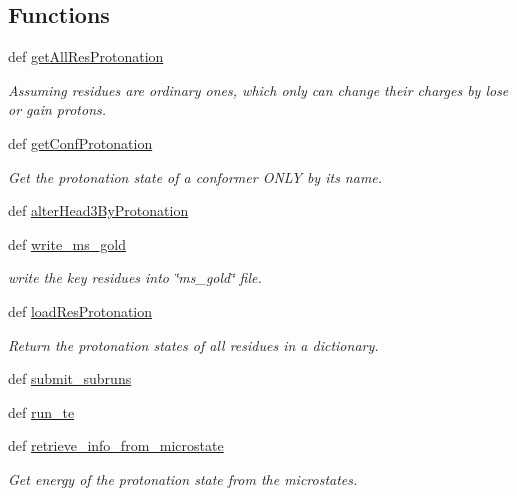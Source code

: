 \subsection*{Functions}
\begin{DoxyCompactItemize}
\item 
def \hyperlink{namespaceget__path__barrier_a0acd5761d8709cb47e042f5b0bb28b87}{get\-All\-Res\-Protonation}
\begin{DoxyCompactList}\small\item\em Assuming residues are ordinary ones, which only can change their charges by lose or gain protons. \end{DoxyCompactList}\item 
def \hyperlink{namespaceget__path__barrier_a3f7f441686d2873474f30787d7e15c02}{get\-Conf\-Protonation}
\begin{DoxyCompactList}\small\item\em Get the protonation state of a conformer O\-N\-L\-Y by its name. \end{DoxyCompactList}\item 
def \hyperlink{namespaceget__path__barrier_a06d1e995b7cb671e3c7f7384d9909e70}{alter\-Head3\-By\-Protonation}
\item 
def \hyperlink{namespaceget__path__barrier_aab0280475e459323e83ae43b9f7920d0}{write\-\_\-ms\-\_\-gold}
\begin{DoxyCompactList}\small\item\em write the key residues into \char`\"{}ms\-\_\-gold\char`\"{} file. \end{DoxyCompactList}\item 
def \hyperlink{namespaceget__path__barrier_a1acaf8207a88a0278006d123f63d915f}{load\-Res\-Protonation}
\begin{DoxyCompactList}\small\item\em Return the protonation states of all residues in a dictionary. \end{DoxyCompactList}\item 
def \hyperlink{namespaceget__path__barrier_a2e3032591bbbd825acc1ed628989a85a}{submit\-\_\-subruns}
\item 
def \hyperlink{namespaceget__path__barrier_a7543ad78f9dc9dd4adff0f19799401d0}{run\-\_\-te}
\item 
def \hyperlink{namespaceget__path__barrier_a0499f254c28c62402064aef734a98a8d}{retrieve\-\_\-info\-\_\-from\-\_\-microstate}
\begin{DoxyCompactList}\small\item\em Get energy of the protonation state from the microstates. \end{DoxyCompactList}\item 

\end{DoxyCompactItemize}
